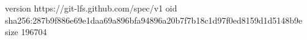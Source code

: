 version https://git-lfs.github.com/spec/v1
oid sha256:287b9f886e69e1daa69a896bfa94896a20b7f7b18c1d97f0ed8159d1d5148b9e
size 196704
